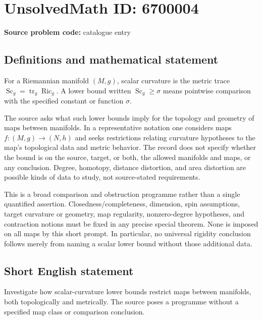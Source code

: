 \documentclass[11pt]{article}
\begin{document}
\section*{UnsolvedMath ID: 6700004}
\textbf{Source problem code:} catalogue entry
\subsection{Definitions and mathematical statement}
For a Riemannian manifold $(M,g)$, scalar curvature is the metric trace $\operatorname{Sc}_g=\operatorname{tr}_g\operatorname{Ric}_g$. A lower bound written $\operatorname{Sc}_g\geq\sigma$ means pointwise comparison with the specified constant or function $\sigma$.

The source asks what such lower bounds imply for the topology and geometry of maps between manifolds. In a representative notation one considers maps $f:(M,g)\to(N,h)$ and seeks restrictions relating curvature hypotheses to the map's topological data and metric behavior. The record does not specify whether the bound is on the source, target, or both, the allowed manifolds and maps, or any conclusion. Degree, homotopy, distance distortion, and area distortion are possible kinds of data to study, not source-stated requirements.

This is a broad comparison and obstruction programme rather than a single quantified assertion. Closedness/completeness, dimension, spin assumptions, target curvature or geometry, map regularity, nonzero-degree hypotheses, and contraction notions must be fixed in any precise special theorem. None is imposed on all maps by this short prompt. In particular, no universal rigidity conclusion follows merely from naming a scalar lower bound without those additional data.
\subsection{Short English statement}
Investigate how scalar-curvature lower bounds restrict maps between manifolds, both topologically and metrically. The source poses a programme without a specified map class or comparison conclusion.
\end{document}
